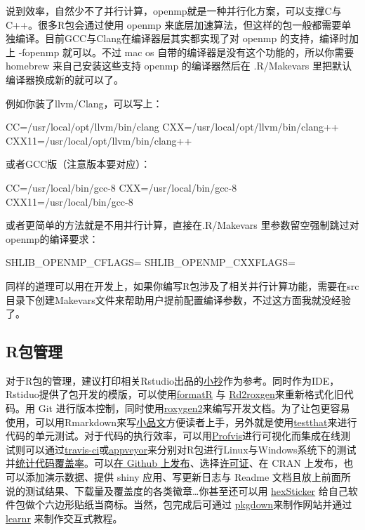 \documentclass[]{tufte-book}
\begin{document}
说到效率，自然少不了并行计算，openmp就是一种并行化方案，可以支撑C与C++。很多R包会通过使用 openmp 来底层加速算法，但这样的包一般都需要单独编译。目前GCC与Clang在编译器层其实都实现了对 openmp 的支持，编译时加上 -fopenmp 就可以。不过 mac os 自带的编译器是没有这个功能的，所以你需要 homebrew 来自己安装这些支持 openmp 的编译器然后在 .R/Makevars 里把默认编译器换成新的就可以了。

例如你装了llvm/Clang，可以写上：

CC=/usr/local/opt/llvm/bin/clang
CXX=/usr/local/opt/llvm/bin/clang++
CXX11=/usr/local/opt/llvm/bin/clang++

或者GCC版（注意版本要对应）：

CC=/usr/local/bin/gcc-8
CXX=/usr/local/bin/gcc-8
CXX11=/usr/local/bin/gcc-8

或者更简单的方法就是不用并行计算，直接在.R/Makevars 里参数留空强制跳过对openmp的编译要求：

SHLIB\_OPENMP\_CFLAGS=
SHLIB\_OPENMP\_CXXFLAGS=

同样的道理可以用在开发上，如果你编写R包涉及了相关并行计算功能，需要在src目录下创建Makevars文件来帮助用户提前配置编译参数，不过这方面我就没经验了。

\hypertarget{rux5305ux7ba1ux7406}{%
\subsection*{R包管理}\label{rux5305ux7ba1ux7406}}

对于R包的管理，建议打印相关Rstudio出品的\href{https://www.rstudio.com/resources/cheatsheets/}{小抄}作为参考。同时作为IDE，Rstiduo提供了包开发的模版，可以使用\href{https://yihui.name/formatr/}{formatR} 与 \href{https://cran.r-project.org/web/packages/Rd2roxygen/index.html}{Rd2roxgen}来重新格式化旧代码。用 Git 进行版本控制，同时使用\href{https://cran.r-project.org/web/packages/roxygen2/index.html}{roxygen2}来编写开发文档。为了让包更容易使用，可以用Rmarkdown来写\href{http://r-pkgs.had.co.nz/vignettes.html}{小品文}方便读者上手，另外就是使用\href{https://github.com/r-lib/testthat}{testthat}来进行代码的单元测试。对于代码的执行效率，可以用\href{https://rstudio.github.io/profvis/}{Profvis}进行可视化而集成在线测试则可以通过\href{https://travis-ci.org/}{travis-ci}或\href{https://www.appveyor.com/}{appveyor}来分别对R包进行Linux与Windows系统下的测试并\href{https://en.wikipedia.org/wiki/Code_coverage}{统计代码覆盖率}。可以\href{https://github.com/}{在 Github 上发布}、选择\href{https://zh.wikipedia.org/wiki/\%E8\%87\%AA\%E7\%94\%B1\%E5\%8F\%8A\%E9\%96\%8B\%E6\%94\%BE\%E5\%8E\%9F\%E5\%A7\%8B\%E7\%A2\%BC\%E8\%BB\%9F\%E9\%AB\%94\%E8\%A8\%B1\%E5\%8F\%AF\%E8\%AD\%89\%E6\%AF\%94\%E8\%BC\%83}{许可证}、在 CRAN 上发布，也可以添加演示数据、提供 shiny 应用、写更新日志与 Readme 文档且放上前面所说的测试结果、下载量及覆盖度的各类徽章\ldots{}你甚至还可以用 \href{https://github.com/GuangchuangYu/hexSticker}{hexSticker} 给自己软件包做个六边形贴纸当商标。当然，包完成后可通过 \href{https://github.com/r-lib/pkgdown}{pkgdown}来制作网站并通过\href{https://rstudio.github.io/learnr/}{learnr} 来制作交互式教程。


\end{document}

